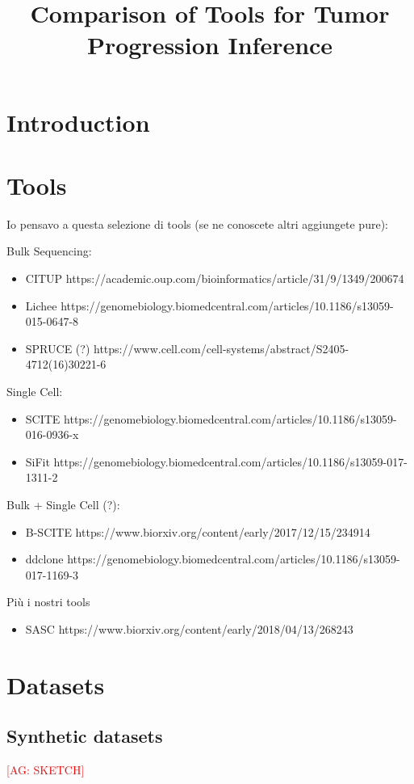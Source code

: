 \documentclass{article}
\title{Comparison of Tools for Tumor Progression Inference}
\author{}
\date{}
\begin{document}
\maketitle

\section{Introduction}

\section{Tools}
Io pensavo a questa selezione di tools (se ne conoscete altri aggiungete pure):

Bulk Sequencing:
\begin{itemize}
\item CITUP https://academic.oup.com/bioinformatics/article/31/9/1349/200674
\item Lichee https://genomebiology.biomedcentral.com/articles/10.1186/s13059-015-0647-8
\item SPRUCE (?) https://www.cell.com/cell-systems/abstract/S2405-4712(16)30221-6
\end{itemize}

Single Cell:
\begin{itemize}
\item SCITE https://genomebiology.biomedcentral.com/articles/10.1186/s13059-016-0936-x
\item SiFit https://genomebiology.biomedcentral.com/articles/10.1186/s13059-017-1311-2
\end{itemize}

Bulk + Single Cell (?):
\begin{itemize}
\item B-SCITE https://www.biorxiv.org/content/early/2017/12/15/234914
\item ddclone https://genomebiology.biomedcentral.com/articles/10.1186/s13059-017-1169-3
\end{itemize}

Più i nostri tools
\begin{itemize}
\item SASC https://www.biorxiv.org/content/early/2018/04/13/268243
\end{itemize}


\section{Datasets}

\subsection{Synthetic datasets}
\textcolor{red}{[AG: SKETCH]}
\end{document}
